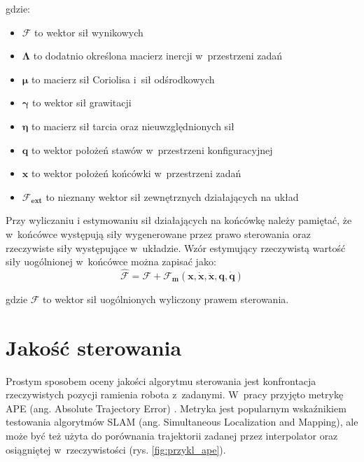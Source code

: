 gdzie:
\begin{itemize}
	\item $\boldsymbol{\mathcal{F}}$ to wektor sił wynikowych
	\item $\boldsymbol{\Lambda}$ to dodatnio określona macierz inercji w~przestrzeni zadań
	\item $\boldsymbol{\mu}$ to macierz sił Coriolisa i~sił odśrodkowych	
	\item $\boldsymbol{\gamma}$ to wektor sił grawitacji
	\item $\boldsymbol{\eta}$ to macierz sił tarcia oraz nieuwzględnionych sił
	\item $\boldsymbol{q}$ to wektor położeń stawów w~przestrzeni konfiguracyjnej
	\item $\boldsymbol{x}$ to wektor położeń końcówki w~przestrzeni zadań
	\item $ \boldsymbol{\mathcal{F}_{ext}}$ to nieznany wektor sił zewnętrznych działających na układ
\end{itemize} 

Przy wyliczaniu i estymowaniu sił działających na końcówkę należy pamiętać, że w~końcówce występują siły wygenerowane przez prawo sterowania oraz rzeczywiste siły występujące w~układzie. Wzór estymujący rzeczywistą wartość siły uogólnionej w~końcówce można zapisać jako:
\begin{equation}
\boldsymbol{\mathcal{\hat{F}}} = \boldsymbol{\mathcal{F}} + \boldsymbol{\mathcal{F}_m}(\boldsymbol{x}, \dot{\boldsymbol{x}}, \ddot{\boldsymbol{x}}, \boldsymbol{q}, \dot{\boldsymbol{q}})
\end{equation}

gdzie $\boldsymbol{\mathcal{F}}$ to wektor sił uogólnionych wyliczony prawem sterowania.

\section{Jakość sterowania}
\label{chap:ape}
Prostym sposobem oceny jakości algorytmu sterowania jest konfrontacja rzeczywistych pozycji ramienia robota z~zadanymi. W~pracy przyjęto metrykę APE (ang. Absolute Trajectory Error) \cite{bib:ape}. Metryka jest popularnym wskaźnikiem testowania algorytmów SLAM (ang. Simultaneous Localization and Mapping), ale może być też użyta do porównania trajektorii zadanej przez interpolator  oraz osiągniętej w~rzeczywistości (rys. \ref{fig:przykl_ape}). 


